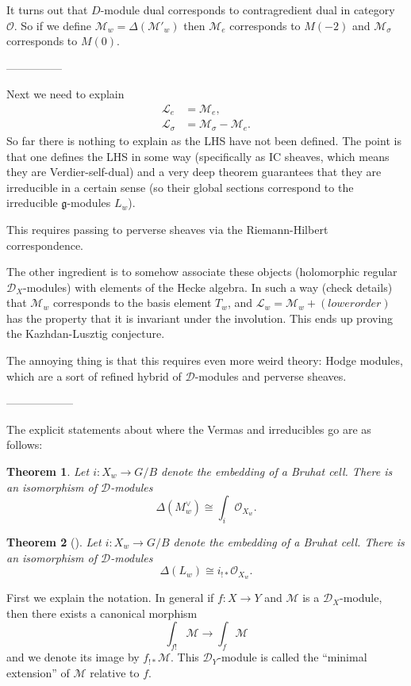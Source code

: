 \documentclass[12pt]{article}
\theoremstyle{plain}
\newtheorem{thm}{Theorem}[section]
\theoremstyle{definition}
\numberwithin{equation}{section}
\newcommand{\M}{\mathcal{M}}
\newcommand{\D}{\Delta}
\newcommand{\g}{\mathfrak{g}}
\newcommand{\CD}{\mathcal{D}}
\newcommand{\CL}{\mathcal{L}}
\newcommand{\OO}{\mathcal{O}}
\newcommand{\CM}{\mathcal{M}}
\begin{document}
It turns out that $D$-module dual corresponds to contragredient dual in category $\OO$. So if we define $\M_w = \D(\M'_w)$ then $\M_e$ corresponds to $M(-2)$ and $\M_\sigma$ corresponds to $M(0)$.

---------------

Next we need to explain
\begin{align*}
\CL_e &= \M_e, \\
%
\CL_\sigma &= \M_\sigma - \M_e.
\end{align*}
So far there is nothing to explain as the LHS have not been defined. The point is that one defines the LHS in some way (specifically as IC sheaves, which means they are Verdier-self-dual) and a very deep theorem guarantees that they are irreducible in a certain sense (so their global sections correspond to the irreducible $\g$-modules $L_w$).

This requires passing to perverse sheaves via the Riemann-Hilbert correspondence.

The other ingredient is to somehow associate these objects (holomorphic regular $\CD_X$-modules) with elements of the Hecke algebra. In such a way (check details) that $\M_w$ corresponds to the basis element $T_w$, and $\CL_w = \M_w + (lower order)$ has the property that it is invariant under the involution. This ends up proving the Kazhdan-Lusztig conjecture.

The annoying thing is that this requires even more weird theory: Hodge modules, which are a sort of refined hybrid of $\CD$-modules and perverse sheaves.


------------------

The explicit statements about where the Vermas and irreducibles go are as follows:
\begin{thm}
Let $i : X_w \rightarrow G/B$ denote the embedding of a Bruhat cell. There is an isomorphism of $\CD$-modules
\[
\D(M_w^\vee) \cong \int_i \OO_{X_w}.
\]
\end{thm}

\begin{thm}[{\cite[Proposition 12.3.2 (i)]{HTT}}]
Let $i : X_w \rightarrow G/B$ denote the embedding of a Bruhat cell. There is an isomorphism of $\CD$-modules
\[
\D(L_w) \cong i_{!*} \OO_{X_w}.
\]
\end{thm}
First we explain the notation. In general if $f : X \rightarrow Y$ and $\CM$ is a $\CD_X$-module, then there exists a canonical morphism
\[
\int_{f!} \CM \rightarrow \int_f \CM
\]
and we denote its image by $f_{!*} \CM$. This $\CD_Y$-module is called the ``minimal extension'' of $\CM$ relative to $f$.
\end{document}
